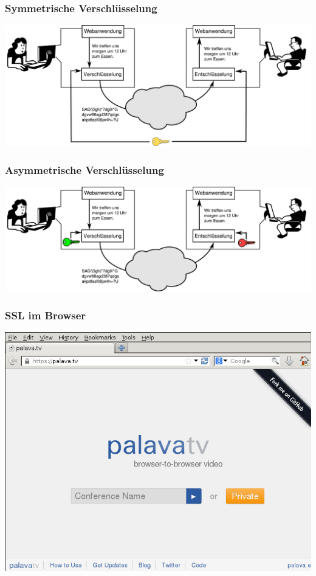 \documentclass[12pt]{beamer}
\begin{document}
\begin{frame}
    \frametitle{Symmetrische Verschlüsselung}
    \includegraphics[width=\textwidth]{img/krypto_symmetric.pdf}
\end{frame}

\begin{frame}
    \frametitle{Asymmetrische Verschlüsselung}
    \includegraphics[width=\textwidth]{img/krypto_asymmetric.pdf}
\end{frame}


\begin{frame}
    \frametitle{SSL im Browser}
    \includegraphics[height=0.7\textheight]{img/ssl_verified.png}
\end{frame}
\end{document}
